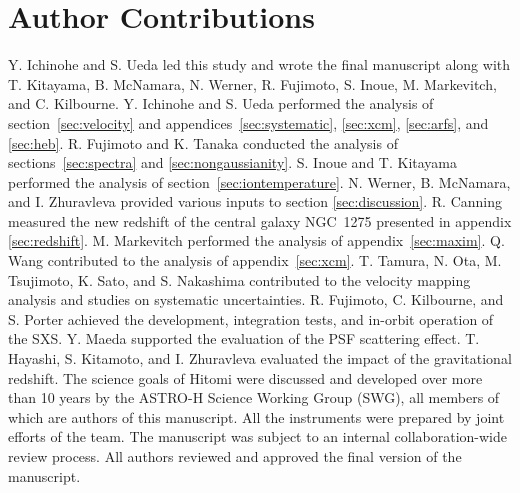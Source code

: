 \section*{Author Contributions}
Y. Ichinohe and S. Ueda led this study and wrote the final manuscript along with T. Kitayama, B. McNamara, N. Werner, R. Fujimoto, S. Inoue, M. Markevitch, and C. Kilbourne.
Y. Ichinohe and S. Ueda performed the analysis of section~\ref{sec:velocity} and appendices~\ref{sec:systematic}, \ref{sec:xcm}, \ref{sec:arfs}, and \ref{sec:heb}.
R. Fujimoto and K. Tanaka conducted the analysis of sections~\ref{sec:spectra} and \ref{sec:nongaussianity}.
S. Inoue and T. Kitayama performed the analysis of section~\ref{sec:iontemperature}.
N. Werner, B. McNamara, and I. Zhuravleva provided various inputs to section \ref{sec:discussion}.
R. Canning measured the new redshift of the central galaxy NGC~1275 presented in appendix \ref{sec:redshift}.
M. Markevitch performed the analysis of appendix~\ref{sec:maxim}.
Q. Wang contributed to the analysis of appendix~\ref{sec:xcm}.
T. Tamura, N. Ota, M. Tsujimoto, K. Sato, and S. Nakashima contributed to the velocity mapping analysis and studies on systematic uncertainties.
R. Fujimoto, C. Kilbourne, and S. Porter achieved the development, integration tests, and in-orbit operation of the SXS.
Y. Maeda supported the evaluation of the PSF scattering effect.
T. Hayashi, S. Kitamoto, and I. Zhuravleva evaluated the impact of the gravitational redshift.
The science goals of Hitomi were discussed and developed over more than 10 years by the ASTRO-H Science Working Group (SWG), all members of which are authors of this manuscript. All the instruments were prepared by joint efforts of the team. The manuscript was subject to an internal collaboration-wide review process. All authors reviewed and approved the final version of the manuscript.
